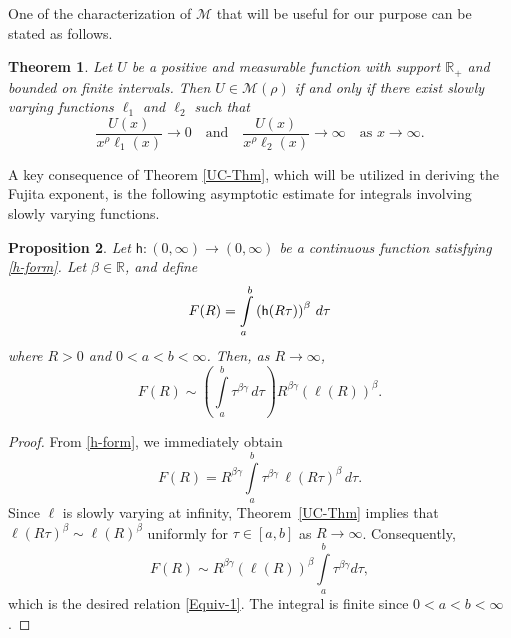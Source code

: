 \documentclass[12pt,reqno]{amsart}
\theoremstyle{plain}
\newtheorem{thm}{Theorem}[section]
\newtheorem{prop}[thm]{Proposition}
\theoremstyle{definition}
\theoremstyle{remark}
\numberwithin{equation}{section}
\newcommand{\R}{\mathbb R}
\renewcommand{\L}{\ell}
\newcommand{\h}{\mathsf h}
\begin{document}
One of the characterization of $\mathcal{M}$ that will be useful for our purpose can be stated as follows.
\begin{thm}{\cite[Theorem~1.3]{Cadena}}
\label{Charact-M}
Let $U$ be a positive and measurable function with support $\R_{+}$ and bounded on finite intervals. Then $U \in \mathcal{M}(\rho)$ if and only if there exist slowly varying functions $\ell_{1}$ and $\ell_{2}$ such that 
\begin{equation}
    \label{Cad-M}
    \frac{U(x)}{x^{\rho} \ell_{1}(x)} \to 0 
\quad \text{and} \quad 
\frac{U(x)}{x^{\rho} \ell_{2}(x)} \to \infty 
\quad \text{as } x \to \infty.
\end{equation}
\end{thm}



A key consequence of Theorem \ref{UC-Thm}, which will be utilized in deriving the Fujita exponent, is the following asymptotic estimate for integrals involving slowly varying functions.
\begin{prop}
    \label{Asymp-Int}
    Let $\h : (0, \infty) \to (0, \infty) $ be a continuous function satisfying \eqref{h-form}.
    Let $ \beta\in\R$, and define
    \begin{equation}
        \label{F-lambda}
        F(R) = \int\limits\limits_a^b \left(\h(R \tau) \right)^{\beta} \, d\tau
    \end{equation}
    where $ R > 0 $ and $ 0 <a < b < \infty $. Then, as $ R \to \infty $,
\begin{equation}
            \label{Equiv-1}
            F(R) \sim \left( \int\limits_a^b \tau^{\beta\gamma} \, d\tau \right) R^{\beta\gamma} \left(\L(R)\right)^{\beta}.
        \end{equation}
\end{prop}
\begin{proof}
  From \eqref{h-form}, we immediately obtain
$$
F(R) = R^{\beta \gamma} \int\limits_a^b \tau^{\beta \gamma}\, \L(R \tau)^{\beta}\, d\tau.
$$
Since $\L$ is slowly varying at infinity, Theorem~\ref{UC-Thm} implies that $\L(R \tau)^{\beta} \sim \L(R)^{\beta}$ uniformly for $\tau \in [a,b]$ as $R \to \infty$. Consequently,
$$
F(R) \sim R^{\beta \gamma} \left(\L(R)\right)^{\beta} \int\limits_a^b \tau^{\beta \gamma}  d\tau,
$$
which is the desired relation \eqref{Equiv-1}. The integral is finite since $0 < a < b < \infty$.
\end{proof}


\end{document}
